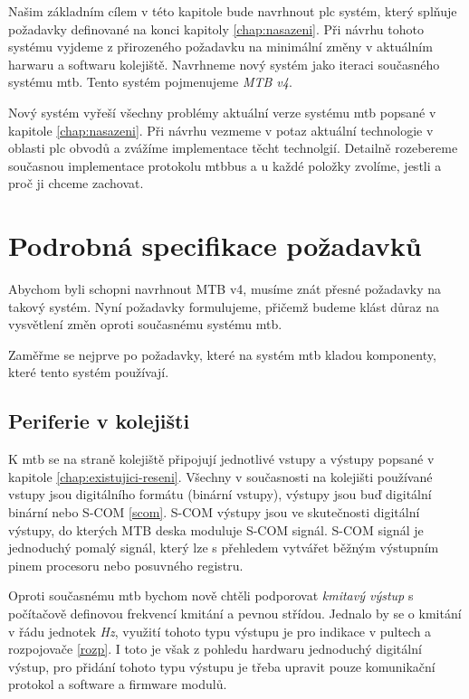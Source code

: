 Našim základním cílem v této kapitole bude navrhnout \gls{plc} systém, který
splňuje požadavky definované na konci kapitoly \ref{chap:nasazeni}. Při návrhu
tohoto systému vyjdeme z přirozeného požadavku na minimální změny v aktuálním
harwaru a softwaru kolejiště. Navrhneme nový systém jako iteraci současného
systému \gls{mtb}. Tento systém pojmenujeme \textit{MTB v4}.

Nový systém vyřeší všechny problémy aktuální verze systému \gls{mtb} popsané
v kapitole \ref{chap:nasazeni}. Při návrhu vezmeme v potaz aktuální technologie
v oblasti \gls{plc} obvodů a zvážíme implementace těcht technolgií. Detailně
rozebereme současnou implementace protokolu \gls{mtbbus} a u každé položky
zvolíme, jestli a proč ji chceme zachovat.

\section{Podrobná specifikace požadavků}

Abychom byli schopni navrhnout MTB v4, musíme znát přesné požadavky na takový
systém. Nyní požadavky formulujeme, přičemž budeme klást důraz na vysvětlení
změn oproti současnému systému \gls{mtb}.

Zaměřme se nejprve po požadavky, které na systém \gls{mtb} kladou komponenty,
které tento systém používají.

\subsection{Periferie v kolejišti}

K \gls{mtb} se na straně kolejiště připojují jednotlivé vstupy a výstupy
popsané v kapitole \ref{chap:existujici-reseni}. Všechny v současnosti na
kolejišti používané vstupy jsou digitálního formátu (binární vstupy), výstupy
jsou buď digitální binární nebo S-COM \ref{scom}. S-COM výstupy jsou ve
skutečnosti digitální výstupy, do kterých MTB deska moduluje S-COM signál.
S-COM signál je jednoduchý pomalý signál, který lze s přehledem vytvářet běžným
výstupním pinem procesoru nebo posuvného registru.

Oproti současnému \gls{mtb} bychom nově chtěli podporovat \textit{kmitavý
výstup} s počítačově definovou frekvencí kmitání a pevnou střídou. Jednalo by
se o kmitání v řádu jednotek \textit{Hz}, využití tohoto typu výstupu je pro
indikace v pultech a rozpojovače \ref{rozp}. I toto je však z pohledu hardwaru
jednoduchý digitální výstup, pro přidání tohoto typu výstupu je třeba upravit
pouze komunikační protokol a software a firmware modulů.

